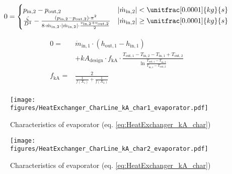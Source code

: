 \begin{equation}
\label{eq:HeatExchanger_zeta2}
0 = \begin{cases}
p_\mathrm{in,2}- p_\mathrm{out,2} & |\dot{m}_\mathrm{in,2}| < \unitfrac[0.0001]{kg}{s} \\
\frac{\zeta}{D^4}-\frac{(p_\mathrm{in,2}-p_\mathrm{out,2})\cdot\pi^2}{8\cdot\dot{m}_\mathrm{in,2}\cdot|\dot{m}_\mathrm{in,2}|\cdot\frac{v_\mathrm{in,2} + v_\mathrm{out,2}}{2}}& |\dot{m}_\mathrm{in,2}| \geq \unitfrac[0.0001]{kg}{s}
\end{cases}
\end{equation}

\begin{equation}
\label{eq:HeatExchanger_kA_char}
\begin{split}
0 = & \dot{m}_\mathrm{in,1} \cdot \left( h_\mathrm{out,1} - h_\mathrm{in,1}\right)\\
&+kA_\mathrm{design} \cdot f_\mathrm{kA} \cdot \frac{T_\mathrm{out,1} - T_\mathrm{in,2} - T_\mathrm{in,1} + T_\mathrm{out,2}}{\ln{\frac{T_\mathrm{out,1} - T_\mathrm{in,2}}{T_\mathrm{in,1} - T_\mathrm{out,2}}}}\\
f_\mathrm{kA}=&\frac{2}{\frac{1}{f\left(X_1\right)}+\frac{1}{f\left(X_2\right)}}\\
\end{split}
\end{equation}

\begin{minipage}{0.5\textwidth}
\begin{figure}[H]\begin{center}
\texttt{[image: figures/HeatExchanger\_CharLine\_kA\_char1\_evaporator.pdf]}
\caption{Characteristics of evaporator (eq. \ref{eq:HeatExchanger_kA_char})}
\label{fig:CharLine_kA_char1_evaporator}
\end{center}\end{figure}

\end{minipage}
\begin{minipage}{0.5\textwidth}
\begin{figure}[H]\begin{center}
\texttt{[image: figures/HeatExchanger\_CharLine\_kA\_char2\_evaporator.pdf]}
\caption{Characteristics of evaporator (eq. \ref{eq:HeatExchanger_kA_char})}
\label{fig:CharLine_kA_char2_evaporator}
\end{center}\end{figure}

\end{minipage}

